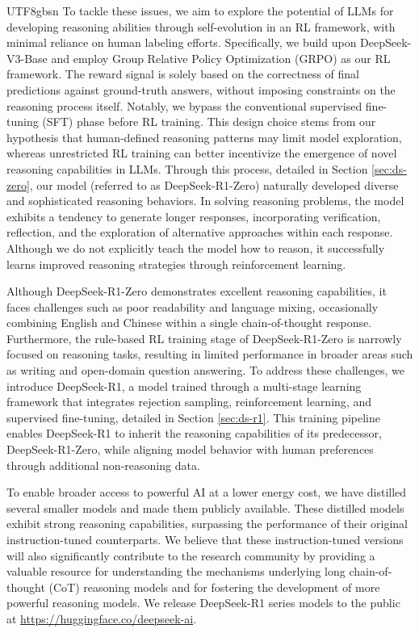 \documentclass[11pt, a4paper, logo, copyright, nonumbering]{deepseek}
\begin{document}
\begin{CJK*}{UTF8}{gbsn}
To tackle these issues, we aim to explore the potential of LLMs for developing reasoning abilities through self-evolution in an RL framework, with minimal reliance on human labeling efforts.
Specifically, we build upon DeepSeek-V3-Base \citep{dsviii} and employ Group Relative Policy Optimization (GRPO) \citep{deepseekmath} as our RL framework. The reward signal is solely based on the correctness of final predictions against ground-truth answers, without imposing constraints on the reasoning process itself. Notably, we bypass the conventional supervised fine-tuning (SFT) phase before RL training. This design choice stems from our hypothesis that human-defined reasoning patterns may limit model exploration, whereas unrestricted RL training can better incentivize the emergence of novel reasoning capabilities in LLMs. 
Through this process, detailed in Section \ref{sec:ds-zero}, our model (referred to as DeepSeek-R1-Zero) naturally developed diverse and sophisticated reasoning behaviors.
In solving reasoning problems, the model exhibits a tendency to generate longer responses, incorporating verification, reflection, and the exploration of alternative approaches within each response. Although we do not explicitly teach the model how to reason, it successfully learns improved reasoning strategies through reinforcement learning.

 
Although DeepSeek-R1-Zero demonstrates excellent reasoning capabilities, it faces challenges such as poor readability and language mixing, occasionally combining English and Chinese within a single chain-of-thought response. Furthermore, the rule-based RL training stage of DeepSeek-R1-Zero is narrowly focused on reasoning tasks, resulting in limited performance in broader areas such as writing and open-domain question answering.
To address these challenges, we introduce DeepSeek-R1, a model trained through a multi-stage learning framework that integrates rejection sampling, reinforcement learning, and supervised fine-tuning, detailed in Section \ref{sec:ds-r1}. This training pipeline enables DeepSeek-R1 to inherit the reasoning capabilities of its predecessor, DeepSeek-R1-Zero, while aligning model behavior with human preferences through additional non-reasoning data. 

To enable broader access to
 powerful AI at a lower energy cost, we have distilled several smaller models and made them publicly available. These distilled models exhibit strong reasoning capabilities, surpassing the performance of their original instruction-tuned counterparts. We believe that these instruction-tuned versions will also significantly contribute to the research community by providing a valuable resource for understanding the mechanisms underlying long chain-of-thought (CoT) reasoning models and for fostering the development of more powerful reasoning models. We release DeepSeek-R1 series  models to the public at \url{https://huggingface.co/deepseek-ai}. 


\end{CJK*}
\end{document}
